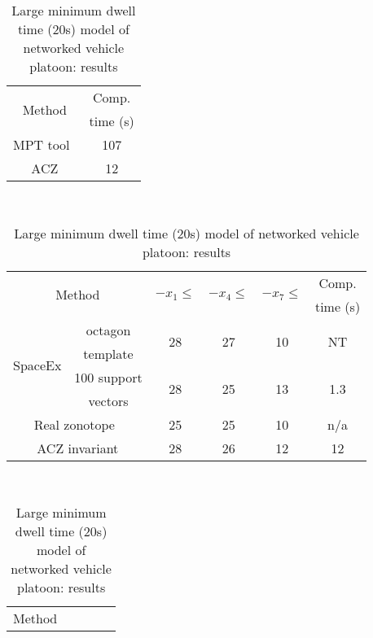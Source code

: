 {\begin{table}
\hspace{4em}
\begin{minipage}{0.4\textwidth}
\begin{tabular}{|c|c|}
\hline
\multirow{2}{*}{Method} & Comp.\\
& time (s)\\
\hline
\multirow{2}{*}{MPT tool~\cite{rakovic2004computation}} & \multirow{2}{*}{107}\\
& \\
\hline
\multirow{2}{*}{ACZ} & \multirow{2}{*}{12}\\
& \\
\hline
\end{tabular}
\caption{Large invariant computation: Perturbed double integrator}
~\label{tab:largeinv-pdi}
\vspace{1em}
\end{minipage}
%
\begin{tabular}{|l|c|c|c|c|c|}
\hline
\multicolumn{2}{|c|}{\multirow{2}{*}{Method}} &
\multirow{2}{*}{$-x_1\leq$} & \multirow{2}{*}{$-x_4\leq$} & \multirow{2}{*}{$-x_7\leq$} & Comp.\\
\multicolumn{2}{|c|}{} & & & & time (s)\\
\hline
\multirow{4}{*}{SpaceEx} & octagon & \multirow{2}{*}{28} &
\multirow{2}{*}{27} & \multirow{2}{*}{10} &
\multirow{2}{*}{NT}\\
& template & & & & \\
\cline{2-6}
& 100 support & \multirow{2}{*}{28} & \multirow{2}{*}{25} &
\multirow{2}{*}{13} & \multirow{2}{*}{1.3}\\
& vectors & & & & \\
\hline
\multicolumn{2}{|c|}{\multirow{2}{*}{Real zonotope~\cite{makhlouf2014networked}}} &
\multirow{2}{*}{25} & \multirow{2}{*}{25} & \multirow{2}{*}{10}
 & \multirow{2}{*}{n/a}\\
\multicolumn{2}{|c|}{} & & & & \\
\hline
\multicolumn{2}{|c|}{\multirow{2}{*}{ACZ invariant}} &
\multirow{2}{*}{28} & \multirow{2}{*}{26} &
\multirow{2}{*}{12} & \multirow{2}{*}{12}\\
\multicolumn{2}{|c|}{} & & & &\\
\hline
\end{tabular}
\caption{Large minimum dwell time (20s) model of networked
  vehicle platoon: results}
~\label{tab:largedwell-platoon}
 $~$\\
\begin{tabular}{|l|c|c|c|c|c|}
\hline
\multicolumn{2}{|c|}{\multirow{2}{*}{Method}} &

\end{tabular}
\end{table}}
